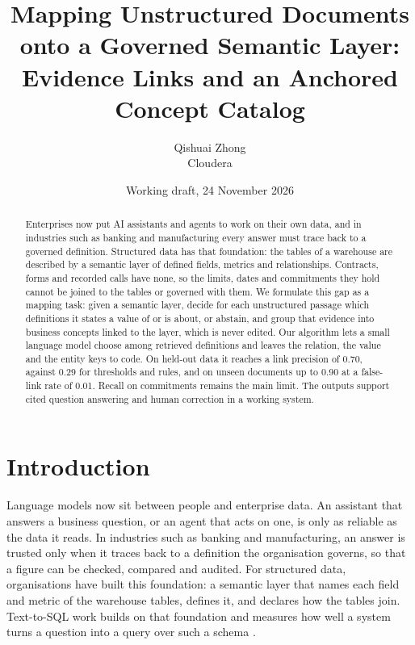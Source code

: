 \documentclass[11pt,a4paper]{article}
\title{Mapping Unstructured Documents onto a Governed Semantic Layer:\\Evidence Links and an Anchored Concept Catalog}
\author{Qishuai Zhong\\Cloudera}
\date{Working draft, 24 November 2026}
\begin{document}
\maketitle

\begin{abstract}
Enterprises now put AI assistants and agents to work on their own data, and in industries such as banking and manufacturing every answer must trace back to a governed definition. Structured data has that foundation: the tables of a warehouse are described by a semantic layer of defined fields, metrics and relationships. Contracts, forms and recorded calls have none, so the limits, dates and commitments they hold cannot be joined to the tables or governed with them. We formulate this gap as a mapping task: given a semantic layer, decide for each unstructured passage which definitions it states a value of or is about, or abstain, and group that evidence into business concepts linked to the layer, which is never edited. Our algorithm lets a small language model choose among retrieved definitions and leaves the relation, the value and the entity keys to code. On held-out data it reaches a link precision of 0.70, against 0.29 for thresholds and rules, and on unseen documents up to 0.90 at a false-link rate of 0.01. Recall on commitments remains the main limit. The outputs support cited question answering and human correction in a working system.
\end{abstract}

\section{Introduction}
Language models now sit between people and enterprise data. An assistant that answers a business question, or an agent that acts on one, is only as reliable as the data it reads. In industries such as banking and manufacturing, an answer is trusted only when it traces back to a definition the organisation governs, so that a figure can be checked, compared and audited.
For structured data, organisations have built this foundation: a semantic layer that names each field and metric of the warehouse tables, defines it, and declares how the tables join. Text-to-SQL work builds on that foundation and measures how well a system turns a question into a query over such a schema \cite{yu2018spider,li2023bird}.
\end{document}
